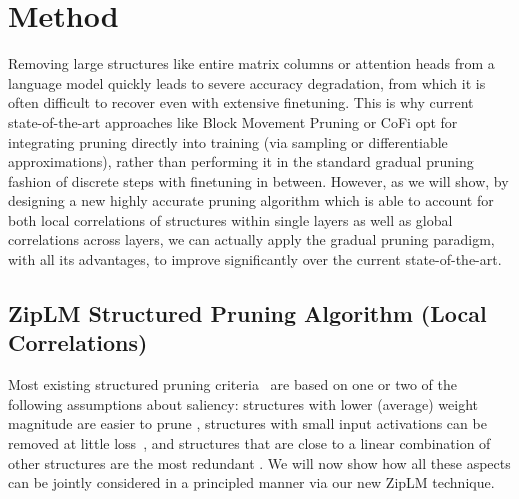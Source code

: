 \documentclass{article}
\theoremstyle{plain}
\theoremstyle{definition}
\theoremstyle{remark}
\begin{document}
\section{Method}
Removing large structures like entire matrix columns or attention heads from a language model quickly leads to severe accuracy degradation, from which it is often difficult to recover even with extensive finetuning. This is why current state-of-the-art approaches like Block Movement Pruning \cite{lagunas21block} or CoFi \cite{xia2022structured} opt for integrating pruning directly into training (via sampling or differentiable approximations), rather than performing it in the standard gradual pruning fashion of discrete steps with finetuning in between. However, as we will show, by designing a new highly accurate pruning algorithm which is able to account for both local correlations of structures within single layers as well as global correlations across layers, we can actually apply the gradual pruning paradigm, with all its advantages, to improve significantly over the current state-of-the-art.

\subsection{ZipLM Structured Pruning Algorithm (Local Correlations)}

Most existing structured pruning criteria~\cite{liu2021group, liebenwein2019provable} are based on one or two of the following assumptions about saliency: structures with lower (average) weight magnitude are easier to prune \cite{he2018amc, li2016pruning}, structures with small input activations can be removed at little loss~\cite{liu2017learning}, and structures that are close to a linear combination of other structures are the most redundant \cite{he2019filter, sui2021chip}. We will now show how all these aspects can be jointly considered in a principled manner via our new ZipLM technique.
\end{document}
